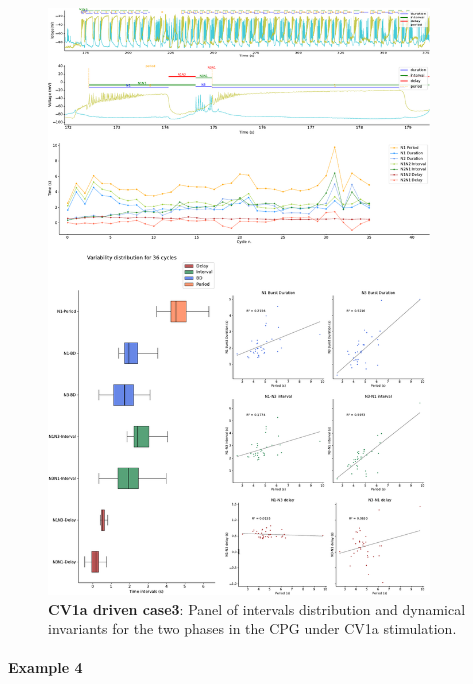 \begin{figure}[htbp]
	\centering
	\includegraphics[width=0.9\textwidth]{./invariants/data/SUSSEX/CV1a_driven3/images/panel_with_intervals.pdf}
	\caption{\textbf{CV1a driven case3}: Panel of intervals distribution and dynamical invariants for the two phases in the CPG under CV1a stimulation.}
	\label{fig:cv1a 3 2phases}
\end{figure}



\paragraph{Example 4}

%


